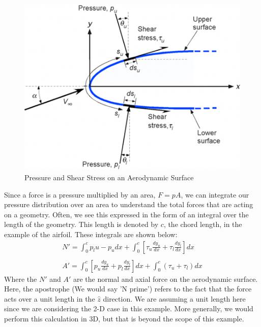 \documentclass[12pt]{report}
\begin{document}
\begin{figure}[ht]
    \centering
    \includegraphics[width=0.8\linewidth]{6DoF Explanation Scripts/Images/ShearStress.png}
    \caption{Pressure and Shear Stress on an Aerodynamic Surface}
    \label{fig:pressure and shear}
\end{figure}

Since a force is a pressure multiplied by an area, $F=pA$, we can integrate our pressure distribution over an area to understand the total forces that are acting on a geometry. Often, we see this expressed in the form of an integral over the length of the geometry. This length is denoted by $c$, the chord length, in the example of the airfoil. These integrals are shown below:
\begin{gather}
    N'=\int_0^{c}{p_lu-p_u}{dx}+\int_0^{c}{\left[\tau_u\frac{dy_u}{dx} + \tau_l\frac{dy_l}{dx}\right]}{dx}\\\\
    A'=\int_0^{c}{\left[p_u\frac{dy_u}{dx} + p_l\frac{dy_l}{dx}\right]}{dx}+\int_0^c{(\tau_u+\tau_l)}{dx}
\end{gather}
Where the $N'$ and $A'$ are the normal and axial force on the aerodynamic surface. Here, the apostrophe (We would say 'N prime') refers to the fact that the force acts over a unit length in the $\hat{z}$ direction. We are assuming a unit length here since we are considering the 2-D case in this example. More generally, we would perform this calculation in 3D, but that is beyond the scope of this example.
\end{document}
